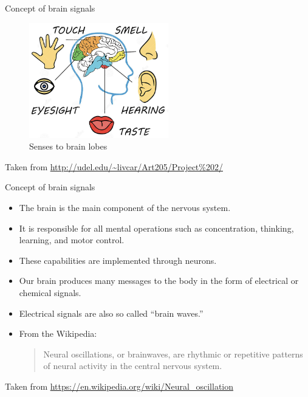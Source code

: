\documentclass{beamer}
\begin{document}
\begin{frame}
{\centerline{Concept of brain signals}}

\begin{figure}
    \centering
    \includegraphics[height=5cm]{P2023.AIBCCSS.BrainSignals/5Senses.jpg}
    \caption{Senses to brain lobes}
\end{figure}

\begin{center}
    \tiny{Taken from \url{http://udel.edu/~livcar/Art205/Project\%202/}}
\end{center}    

\end{frame}

\begin{frame}
{\centerline{Concept of brain signals}}
\begin{itemize}
    \item The brain is the main component of the nervous system. 
    \item It is responsible for all mental operations such as concentration, thinking, learning, and motor control.
    \item These capabilities are implemented through neurons.
    \item  Our brain produces many messages to the body in the form of electrical or chemical signals.
    \item Electrical signals are also so called ``brain waves.''
    \item From the Wikipedia:
    \begin{quote}
        Neural oscillations, or brainwaves, are rhythmic or repetitive patterns of neural activity in the central nervous system.
    \end{quote}
\end{itemize}

\begin{center}
    \tiny{Taken from \url{https://en.wikipedia.org/wiki/Neural_oscillation}}
\end{center}    

\end{frame}
\end{document}
